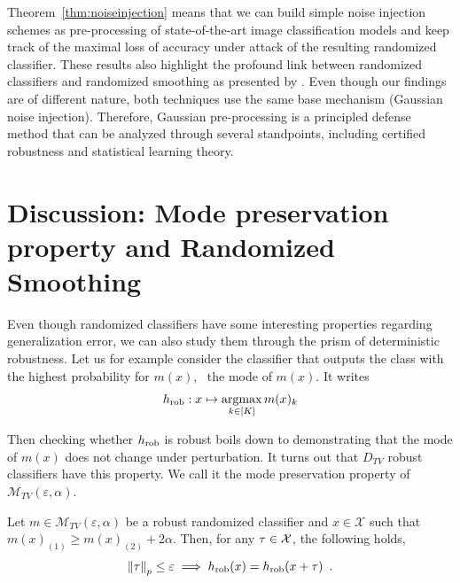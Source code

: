 Theorem~\ref{thm:noiseinjection} means that we can build simple noise injection schemes as pre-processing of state-of-the-art image classification models and keep track of the maximal loss of accuracy under attack of the resulting randomized classifier. These results also highlight the profound link between randomized classifiers and randomized smoothing as presented by \cite{KolterRandomizedSmoothing}. Even though our findings are of different nature, both techniques use the same base mechanism (Gaussian noise injection). 
Therefore, Gaussian pre-processing is a principled defense method that can be analyzed through several standpoints, including certified robustness and statistical learning theory.

\section{Discussion: Mode preservation property and Randomized Smoothing}
\label{sec:modepreservationendRS}

Even though randomized classifiers have some interesting properties regarding generalization error, we can also study them through the prism of deterministic robustness. Let us for example consider the classifier that outputs the class with the highest probability for $m (x )$, \aka~the mode of $m (x )$. It writes
\begin{equation}
\label{eq:modeandRandomizedSmoothing}
    {h}_{\text{rob}}: x  \mapsto  \operatorname*{argmax}\limits_{k \in [K]} m (x )_k
\end{equation}

Then checking whether ${h}_{\text{rob}}$ is robust boils down to demonstrating that the mode of $m (x )$ does not change under perturbation. It turns out that $D_{TV}$ robust classifiers have this property. We call it the mode preservation property of $\mathcal{M}_{TV}(\varepsilon,\alpha)$.
\begin{prop} 
\label{prop:modepreservationforTV}
Let $m  \in \mathcal{M}_{TV}\left(\varepsilon,\alpha\right)$ be a robust randomized classifier and $x  \in \mathcal{X}$ such that $m (x )_{(1)} \geq m (x )_{(2)} +2 \alpha$. Then, for any ${\tau} \in \mathcal{X}$, the following holds,
\begin{equation*}
\norm{{\tau}}_p \leq \varepsilon \implies {h}_{\text{rob}}(x )  = {h}_{\text{rob}}(x  + {\tau} )\enspace.
\end{equation*}
\end{prop}

